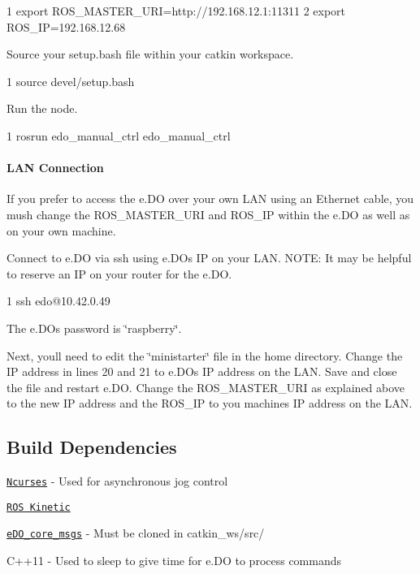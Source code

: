 \begin{DoxyCode}
1 export ROS\_MASTER\_URI=http://192.168.12.1:11311
2 export ROS\_IP=192.168.12.68
\end{DoxyCode}


Source your setup.\+bash file within your catkin workspace.


\begin{DoxyCode}
1 source devel/setup.bash
\end{DoxyCode}


Run the node.


\begin{DoxyCode}
1 rosrun edo\_manual\_ctrl edo\_manual\_ctrl
\end{DoxyCode}
 \paragraph*{L\+AN Connection}

If you prefer to access the e.\+DO over your own L\+AN using an Ethernet cable, you mush change the R\+O\+S\+\_\+\+M\+A\+S\+T\+E\+R\+\_\+\+U\+RI and R\+O\+S\+\_\+\+IP within the e.\+DO as well as on your own machine.

Connect to e.\+DO via ssh using e.\+DO\textquotesingle{}s IP on your L\+AN. N\+O\+TE\+: It may be helpful to reserve an IP on your router for the e.\+DO. 
\begin{DoxyCode}
1 ssh edo@10.42.0.49
\end{DoxyCode}
 The e.\+DO\textquotesingle{}s password is \char`\"{}raspberry\char`\"{}.

Next, you\textquotesingle{}ll need to edit the \char`\"{}ministarter\char`\"{} file in the home directory. Change the IP address in lines 20 and 21 to e.\+DO\textquotesingle{}s IP address on the L\+AN. Save and close the file and restart e.\+DO. Change the R\+O\+S\+\_\+\+M\+A\+S\+T\+E\+R\+\_\+\+U\+RI as explained above to the new IP address and the R\+O\+S\+\_\+\+IP to you machine\textquotesingle{}s IP address on the L\+AN.

\subsection*{Build Dependencies}


\begin{DoxyItemize}
\item \href{https://www.cyberciti.biz/faq/linux-install-ncurses-library-headers-on-debian-ubuntu-centos-fedora/}{\tt Ncurses} -\/ Used for asynchronous jog control
\item \href{http://wiki.ros.org/kinetic.Installation}{\tt R\+OS Kinetic}
\item \href{https://github.com/Comau/eDO_core_msgs}{\tt e\+D\+O\+\_\+core\+\_\+msgs} -\/ Must be cloned in catkin\+\_\+ws/src/
\item C++11 -\/ Used to sleep to give time for e.\+DO to process commands
\end{DoxyItemize}

